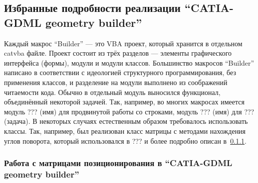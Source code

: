 \subsection{Избранные подробности реализации ``CATIA-GDML geometry builder''}

Каждый макрос ``Builder'' --- это VBA проект, который хранится в отдельном catvba файле. Проект состоит из трёх разделов --- элементы графического интерфейса (формы), модули и модули классов. Большинство макросов ``Builder'' написано в соответствии с идеологией структурного программирования, без применения классов, и разделение на модули выполнено из соображений читаемости кода. Обычно в отдельный модуль выносился функционал, объединённый некоторой задачей. Так, например, во многих макросах имеется модуль ??? (имя) для продвинутой работы со строками, модуль ??? (имя) для ??? (задача). В некоторых случаях естественным образом требовалось использовать классы. Так, например, был реализован класс матрицы с методами нахождения углов поворота, который использовался в ??? и более подробно описан в~\ref{sec:Matrices}.

\subsubsection{Работа с матрицами позиционирования в ``CATIA-GDML geometry builder''}\label{sec:Matrices}
